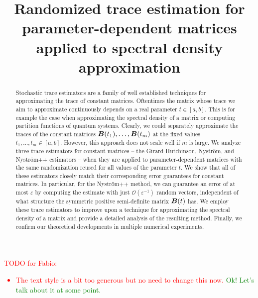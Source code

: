 \documentclass[12pt]{article}
\title{Randomized trace estimation for parameter-dependent matrices applied to spectral density approximation}
\begin{document}
\maketitle



\begin{abstract}
    Stochastic trace estimators are a family of well established techniques for approximating the trace of constant matrices. Oftentimes the matrix whose trace we aim to approximate continuously depends on a real parameter $t \in [a,b]$. This is for example the case when approximating the spectral density of a matrix or computing partition functions of quantum systems. Clearly, we could separately approximate the traces of the constant matrices $\boldsymbol{B}(t_1), \dots, \boldsymbol{B}(t_m)$ at the fixed values $t_1, \dots, t_m \in [a, b]$. However, this approach does not scale well if $m$ is large. We analyze three trace estimators for constant matrices -- the Girard-Hutchinson, Nyström, and Nyström++ estimators -- when they are applied to parameter-dependent matrices with the same randomization reused for all values of the parameter $t$. We show that all of these estimators closely match their corresponding error guarantees for constant matrices. In particular, for the Nyström++ method, we can guarantee an error of at most $\varepsilon$ by computing the estimate with just $\mathcal{O}(\varepsilon^{-1})$ random vectors, independent of what structure the symmetric positive semi-definite matrix $\boldsymbol{B}(t)$ has. We employ these trace estimators to improve upon a technique for approximating the spectral density of a matrix and provide a detailed analysis of the resulting method. Finally, we confirm our theoretical developments in multiple numerical experiments.
\end{abstract}

\textcolor{red}{TODO for Fabio:
\begin{itemize}
 \item The text style is a bit too generous but no need to change this now. \textcolor{green}{Ok! Let's talk about it at some point.}
\end{itemize}
}
\color{blue}




\end{document}
